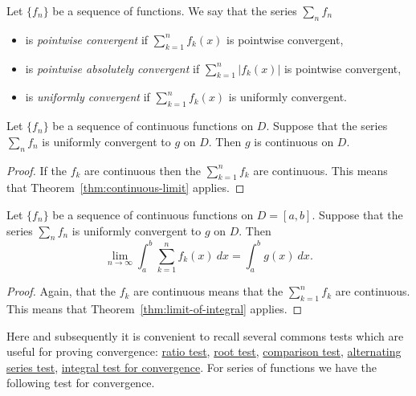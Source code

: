 \begin{definition}
  Let \(\{f_n\}\) be a sequence of functions.
  We say that the series \(\sum_{n} f_n\)
  \begin{itemize}
    \item   is \emph{pointwise convergent} if
          \(\sum_{k=1}^{n} f_k(x)\) is pointwise convergent,
    \item   is \emph{pointwise absolutely convergent} if
          \(\sum_{k=1}^{n} |f_k(x)|\) is pointwise convergent,
    \item   is \emph{uniformly convergent} if
          \(\sum_{k=1}^{n} f_k(x)\) is uniformly convergent.
  \end{itemize}
\end{definition}


\begin{theorem}
  Let $\{f_n\}$ be a sequence of continuous functions on $D$.
  Suppose that the series \(\sum_{n} f_n\) is uniformly convergent to \(g\) on \(D\).
  Then \(g\) is continuous on \(D\).
\end{theorem}

\begin{proof}
  If the \(f_k\) are continuous then the \(\sum_{k=1}^{n} f_k\) are continuous.
  This means that Theorem~\ref{thm:continuous-limit} applies.
\end{proof}

\begin{theorem}
  Let $\{f_n\}$ be a sequence of continuous functions on $D = [a,b]$.
  Suppose that the series \(\sum_{n} f_n\) is uniformly convergent to \(g\) on \(D\).
  Then
  \[
    \lim_{n\to\infty} \int_{a}^{b}  \sum_{k=1}^{n} f_k(x)  \ dx = \int_{a}^{b} g(x) \ dx.
  \]
\end{theorem}

\begin{proof}
  Again, that the \(f_k\) are continuous means that the \(\sum_{k=1}^{n} f_k\) are continuous.
  This means that Theorem~\ref{thm:limit-of-integral} applies.
\end{proof}

Here and subsequently it is convenient to recall several commons tests which are useful for proving convergence:
\href{https://en.wikipedia.org/wiki/Ratio_test}{ratio test},
\href{https://en.wikipedia.org/wiki/Root_test}{root test},
\href{https://en.wikipedia.org/wiki/Direct_comparison_test}{comparison test},
\href{https://en.wikipedia.org/wiki/Alternating_series_test}{alternating series test},
\href{https://en.wikipedia.org/wiki/Integral_test_for_convergence}{integral test for convergence}.
%
For series of functions we have the following test for convergence.

